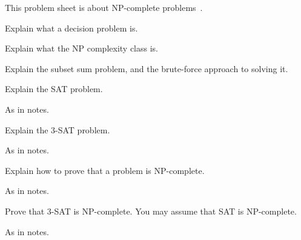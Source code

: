 

\noindent
This problem sheet is about NP-complete problems~\cite{sipserbook}.

\begin{questions}

\question
Explain what a decision problem is.

\question
Explain what the NP complexity class is. 

\question
Explain the subset sum problem, and the brute-force approach to solving it.

\question
Explain the SAT problem.
\begin{solution}
As in notes.
\end{solution}

\question
Explain the 3-SAT problem.
\begin{solution}
As in notes.
\end{solution}

\question
Explain how to prove that a problem is NP-complete.
\begin{solution}
As in notes.
\end{solution}


\question
Prove that 3-SAT is NP-complete. You may assume that SAT is NP-complete.
\begin{solution}
As in notes.
\end{solution}

\end{questions}
